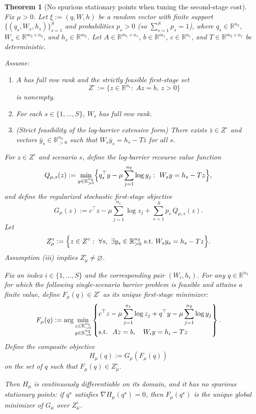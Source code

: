 \documentclass[11pt]{article}
\theoremstyle{plain}
\newtheorem{theorem}{Theorem}
\theoremstyle{definition}
\begin{document}
\begin{theorem}[No spurious stationary points when tuning the second-stage cost]
\label{thm:no-spurious-q}
Fix $\mu>0$. Let $\xi:=(q,W,h)$ be a random vector with \emph{finite support}
$\{(q_s,W_s,h_s)\}_{s=1}^S$ and probabilities $p_s>0$ (so $\sum_{s=1}^S p_s=1$), where
$q_s\in\mathbb{R}^{n_2}$, $W_s\in\mathbb{R}^{m_2\times n_2}$, and $h_s\in\mathbb{R}^{m_2}$.
Let $A\in\mathbb{R}^{m_1\times n_1}$, $b\in\mathbb{R}^{m_1}$, $c\in\mathbb{R}^{n_1}$, and
$T\in\mathbb{R}^{m_2\times n_1}$ be deterministic.

Assume:
\begin{enumerate}
\item[\textnormal{(i)}] $A$ has full row rank and the strictly feasible first-stage set
\[
Z^\circ:=\{z\in\mathbb{R}^{n_1}:\ Az=b,\ z>0\}
\]
is nonempty.
\item[\textnormal{(ii)}] For each $s\in\{1,\dots,S\}$, $W_s$ has full row rank.
\item[\textnormal{(iii)}] (\emph{Strict feasibility of the log-barrier extensive form}) There exists
$\bar z\in Z^\circ$ and vectors $\bar y_s\in\mathbb{R}^{n_2}_{>0}$ such that
$W_s\bar y_s = h_s - T\bar z$ for all $s$.
\end{enumerate}

For $z\in Z^\circ$ and scenario $s$, define the log-barrier recourse value function
\[
Q_{\mu,s}(z)
:=\min_{y\in\mathbb{R}^{n_2}_{>0}}
\Bigl\{q_s^\top y-\mu\sum_{j=1}^{n_2}\log y_j:\ W_s y = h_s - Tz\Bigr\},
\]
and define the regularized stochastic first-stage objective
\[
G_\mu(z)
:=c^\top z-\mu\sum_{j=1}^{n_1}\log z_j+\sum_{s=1}^S p_s\,Q_{\mu,s}(z).
\]
Let
\[
Z_\mu^\circ
:=\Bigl\{z\in Z^\circ:\ \forall s,\ \exists y_s\in\mathbb{R}^{n_2}_{>0}\ \text{s.t.}\ W_s y_s=h_s-Tz\Bigr\}.
\]
Assumption \textnormal{(iii)} implies $Z_\mu^\circ\neq\varnothing$.

Fix an index $i\in\{1,\dots,S\}$ and the corresponding pair $(W_i,h_i)$.
For any $q\in\mathbb{R}^{n_2}$ for which the following single-scenario barrier problem is feasible
and attains a finite value, define $F_\mu(q)\in Z^\circ$ as its unique first-stage minimizer:
\[
F_\mu(q)
:=\arg\min_{\substack{z\in\mathbb{R}^{n_1}_{>0}\\ y\in\mathbb{R}^{n_2}_{>0}}}
\left\{
\begin{aligned}
& c^\top z-\mu\sum_{j=1}^{n_1}\log z_j + q^\top y-\mu\sum_{j=1}^{n_2}\log y_j \\
& \textnormal{s.t.}\ \ Az=b,\quad W_i y = h_i - Tz
\end{aligned}
\right\}.
\]
Define the composite objective
\[
H_\mu(q):=G_\mu(F_\mu(q))
\]
on the set of $q$ such that $F_\mu(q)\in Z_\mu^\circ$.

Then $H_\mu$ is continuously differentiable on its domain, and it has \emph{no spurious stationary points}:
if $q^\star$ satisfies $\nabla H_\mu(q^\star)=0$, then $F_\mu(q^\star)$ is the \emph{unique} global
minimizer of $G_\mu$ over $Z_\mu^\circ$.
\end{theorem}
\end{document}
